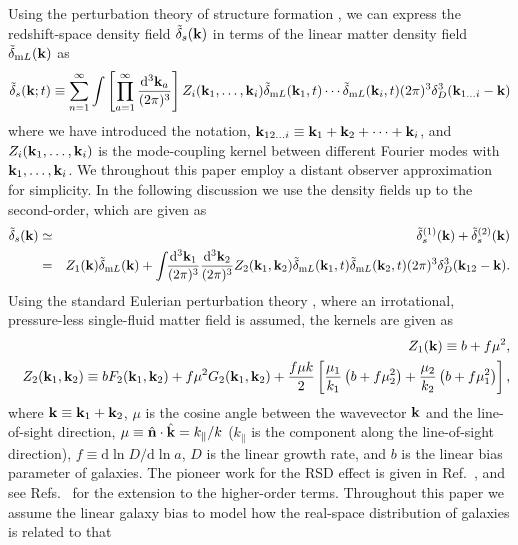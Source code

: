 \documentclass[prd,onecolumn,notitlepage,amsmath,amssymb,floatfix,superscriptaddress]{revtex4-1}
\newcommand{\bk}{{\bf k}}
\newcommand{\bn}{{\bf n}}
\newcommand{\tdelta}{\tilde{\delta}}
\newcommand{\tdml}{\tilde{\delta}_{{\rm m}L}}
\begin{document}
Using the perturbation theory of structure formation \cite{Bernardeauetal:02}, we can 
express the redshift-space density field $\tdelta_s(\bk)$ in terms of the linear matter density field
$\tdml(\bk)$ as
%
\begin{equation}
\tdelta_s(\bk; t)\equiv \sum_{n=1}^\infty 
\int\left[\prod_{a=1}^{\infty}
\frac{\mathrm{d}^3\bk_a}{(2\pi)^3}\right]Z_i(\bk_1,\dots,\bk_i)
\tdml(\bk_1,t)\cdots\tdml(\bk_i,t)(2\pi)^3\delta_D^{3}(\bk_{1\dots i}-\bk)
\end{equation}
%
where we have introduced the notation, $\bk_{12\dots i}\equiv \bk_1+\bk_2+\cdots +\bk_i$, 
and $Z_i(\bk_1,\dots,\bk_i)$ is the mode-coupling 
kernel between different Fourier modes with $\bk_1, \dots ,\bk_i$. 
 We throughout this paper 
employ a distant observer approximation for simplicity. 
In the following discussion we use the density fields
up to the second-order, which are given as 
%
\begin{eqnarray}
\tdelta_s(\bk)&\simeq& \tdelta_s^{(1)}(\bk)+\tdelta_s^{(2)}(\bk)\nonumber\\
&=&Z_1(\bk)\tdml(\bk)+\int\!\!\frac{\mathrm{d}^3\bk_1}{(2\pi)^3}\frac{\mathrm{d}^3\bk_2}{(2\pi)^3}
Z_2(\bk_1,\bk_2)\tdml(\bk_1,t)\tdml(\bk_2,t)(2\pi)^3\delta^{3}_D(\bk_{12}-\bk).
\label{eq:deltas_pt}
\end{eqnarray}
%
Using the standard Eulerian perturbation theory \cite{Goroffetal:86,Makinoetal:92,JainBertschinger:94}, where 
an irrotational, pressure-less single-fluid matter field is assumed, the kernels are given as
%
\begin{eqnarray}
&&Z_1(\bk)\equiv b+f\mu^2, \label{eq:delta_kaiser}\nonumber\\
&&Z_2(\bk_1,\bk_2)
\equiv bF_2(\bk_1,\bk_2)+f\mu^2 G_2(\bk_1,\bk_2)+\frac{f\mu k}{2}\left[
\frac{\mu_1}{k_1}\left(b+f\mu_2^2\right)+
\frac{\mu_2}{k_2}\left(b+f\mu_1^2\right)
\right],
\label{eq:Zn}
\end{eqnarray}
%
where $\bk\equiv \bk_1+\bk_2$,
$\mu$ is the cosine angle between the wavevector $\bk$ and the line-of-sight direction, 
$\mu\equiv \hat{\bn}\cdot\hat{\bk}=k_\parallel/k$ ($k_{\parallel}$ is the component along the line-of-sight direction),
$f\equiv \mathrm{d}\ln D/\mathrm{d}\ln a$,  $D$ is the linear growth rate, and $b$ is the linear bias parameter of galaxies. 
The pioneer work for the RSD effect is given in Ref.~\cite{Kaiser:87},
and see Refs.~\cite{Hivonetal:95,Verdeetal:98,Scoccimarroetal:99,Scoccimarro:04} for the extension to the higher-order terms.   
Throughout this paper we assume the linear galaxy bias to model how the real-space distribution of galaxies is related to that
\end{document}
